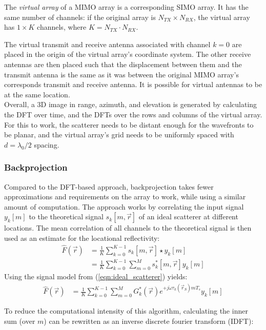 The \textit{virtual array} of a MIMO array is a corresponding SIMO array.
It has the same number of channels:
if the original array is $N_{TX} \times N_{RX}$, the virtual array has $1 \times K$ channels, where $K=N_{TX} \cdot N_{RX}$.

The virtual transmit and receive antenna associated with channel $k=0$ are placed in the origin of the virtual array's coordinate system.
The other receive antennas are then placed such that the displacement between them and the transmit antenna
is the same as it was between the original MIMO array's corresponds transmit and receive antenna.
It is possible for virtual antennas to be at the same location.
\\

Overall, a 3D image in range, azimuth, and elevation is generated
by calculating the DFT over time, and the DFTs over the rows and columns of the virtual array.
For this to work, the scatterer needs to be distant enough for the wavefronts to be planar,
and the virtual array's grid needs to be uniformly spaced with $d=\lambda_0/2$ spacing.

\subsubsection*{Backprojection}
Compared to the DFT-based approach, backprojection takes fewer approximations and requirements on the array to work,
while using a similar amount of computation.
The approach works by correlating the input signal $y_k[m]$
to the theoretical signal $s_k[m, \vec r]$ of an ideal scatterer at different locations.
The mean correlation of all channels to the theoretical signal is then used as an estimate for the locational reflectivity:
\begin{align}
    \hat F(\vec r) & = \frac{1}{K} \sum_{k=0}^{K-1} s_k[m, \vec r] \star y_k[m]             \\
                   & = \frac{1}{K}\sum_{k=0}^{K-1}\sum_{m=0}^{M} s_k^\ast[m, \vec r] y_k[m]
\end{align}
Using the signal model from (\ref*{eqn:ideal_scatterer}) yields:
\begin{align}
    \hat F(\vec r) & = \frac{1}{K}\sum_{k=0}^{K-1}\sum_{m=0}^{M}
    G_k^\ast(\vec r)e^{+j\dot\omega\tau_k(\vec r_S)mT_s} y_k[m]
\end{align}

To reduce the computational intensity of this algorithm,
calculating the inner sum (over $m$) can be rewritten as an inverse discrete fourier transform (IDFT):

